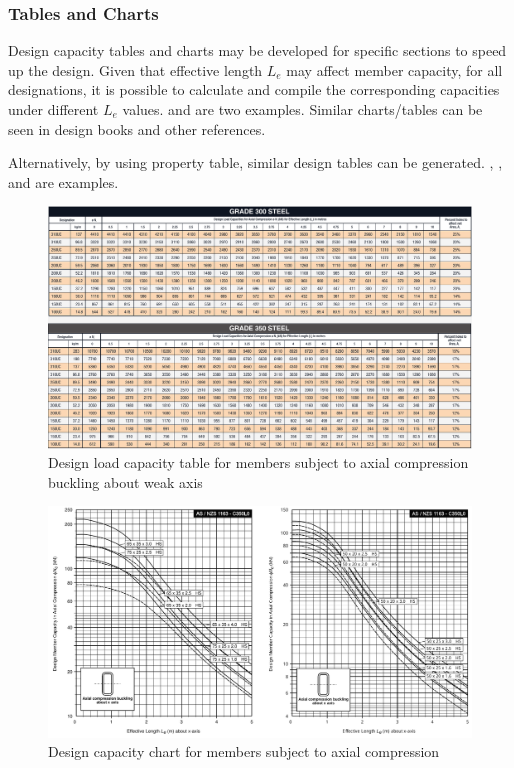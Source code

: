\subsubsection{Tables and Charts}
Design capacity tables and charts may be developed for specific sections to speed up the design. Given that effective length $L_e$ may affect member capacity, for all designations, it is possible to calculate and compile the corresponding capacities under different $L_e$ values.  and  are two examples. Similar charts/tables can be seen in design books and other references.

Alternatively, by using property table, similar design tables can be generated. , ,  and  are examples.
\begin{figure}
\centering
\includegraphics[width=\linewidth]{PIC/CH04/TABLE}
\caption{Design load capacity table for members subject to axial compression buckling about weak axis}\label{fig:design_table}
\end{figure}
\begin{figure}
\centering
\includegraphics[width=\linewidth]{PIC/CH04/CHART}
\caption{Design capacity chart for members subject to axial compression}\label{fig:design_chart}
\end{figure}
